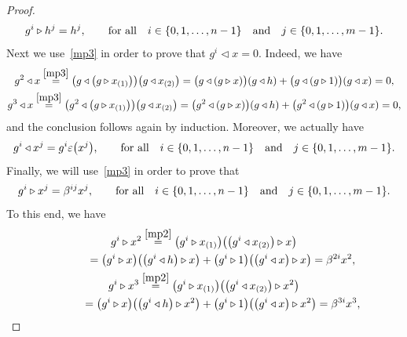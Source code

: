 \documentclass[11pt]{article}
\numberwithin{equation}{section}
\begin{document}
\begin{proof}
\begin{gather}
g^{i} \triangleright h^{j} = h^{j}, \qquad \text{for all} \quad i \in \{0, 1,\dots, n-1\} \quad {\rm and} \quad j \in \{0, 1,\dots, m-1\}.
\end{gather}
Next we use~\eqref{mp3} in order to prove that $g^{i} \triangleleft x =0$. Indeed, we have
\begin{gather*}
g^{2} \triangleleft x \stackrel{\eqref{mp3}} {=} \big(g \triangleleft \big(g \triangleright x_{(1)}\big)\big) \big(g \triangleleft
x_{(2)}\big) = \big(g \triangleleft (g \triangleright x)\big) (g \triangleleft h) + \big(g \triangleleft (g \triangleright 1)\big) (g \triangleleft x)=0, \\
g^{3} \triangleleft x \stackrel{\eqref{mp3}} {=} \big(g^{2} \triangleleft \big(g \triangleright x_{(1)}\big)\big) \big(g \triangleleft
x_{(2)}\big)= \big(g^{2} \triangleleft (g \triangleright x)\big) (g \triangleleft h) + \big(g^{2} \triangleleft (g \triangleright 1)\big) (g \triangleleft x)=0,
\end{gather*}
and the conclusion follows again by induction. Moreover, we actually have
\begin{gather*}%
g^{i} \triangleleft x^{j} = g^{i} \varepsilon\big(x^{j}\big), \qquad \text{for all} \quad i \in \{0, 1,\dots, n-1\} \quad {\rm and} \quad j \in \{0, 1,\dots, m-1\}.
\end{gather*}
Finally, we will use~\eqref{mp3} in order to prove that
\begin{gather}\label{003}
g^{i} \triangleright x^{j} = \beta^{ij}x^{j}, \qquad \text{for all} \quad i \in \{0, 1,\dots, n-1\} \quad {\rm and} \quad j \in \{0, 1,\dots, m-1\}.
\end{gather}
To this end, we have
\begin{gather*}
g^{i} \triangleright x^{2} \stackrel{\eqref{mp2}} {=} \big(g^{i} \triangleright x_{(1)}\big)\big( \big(g^{i} \triangleleft
x_{(2)}\big)\triangleright x\big) \\
\hphantom{g^{i} \triangleright x^{2}}{} \ = \big(g^{i} \triangleright x\big)\big( \big(g^{i} \triangleleft h\big)\triangleright x\big) + \big(g^{i} \triangleright 1\big)\big( \big(g^{i} \triangleleft x\big)\triangleright x\big) = \beta^{2i}x^{2},\\
g^{i} \triangleright x^{3} \stackrel{\eqref{mp2}} {=} \big(g^{i} \triangleright x_{(1)}\big)\big( \big(g^{i} \triangleleft
x_{(2)}\big)\triangleright x^{2}\big)\\
 \hphantom{g^{i} \triangleright x^{3}}{} \ = \big(g^{i} \triangleright x\big)\big( \big(g^{i} \triangleleft h\big)\triangleright x^{2}\big) + \big(g^{i} \triangleright 1\big)\big( \big(g^{i} \triangleleft x\big)\triangleright x^{2}\big) =\beta^{3i}x^{3},

\end{gather*}
\end{proof}
\end{document}
